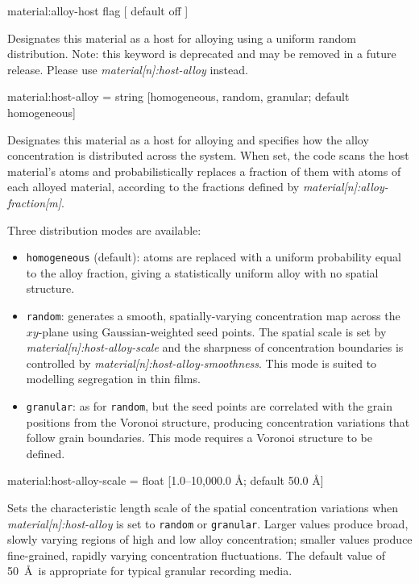 {\zicf material:alloy-host flag [ default off ]} Designates this material as a host for alloying using a uniform random distribution. Note: this keyword is deprecated and may be removed in a future release. Please use \textit{material[n]:host-alloy} instead.


{\zicf material:host-alloy = string [homogeneous, random, granular; default homogeneous]} Designates this material as a host for alloying and specifies how the alloy concentration is distributed across the system. When set, the code scans the host material's atoms and probabilistically replaces a fraction of them with atoms of each alloyed material, according to the fractions defined by \textit{material[n]:alloy-fraction[m]}.

Three distribution modes are available:
\begin{itemize}
  \item[] \texttt{homogeneous} (default): atoms are replaced with a uniform probability equal to the alloy fraction, giving a statistically uniform alloy with no spatial structure.
  \item[] \texttt{random}: generates a smooth, spatially-varying concentration map across the $xy$-plane using Gaussian-weighted seed points. The spatial scale is set by \textit{material[n]:host-alloy-scale} and the sharpness of concentration boundaries is controlled by \textit{material[n]:host-alloy-smoothness}. This mode is suited to modelling segregation in thin films.
  \item[] \texttt{granular}: as for \texttt{random}, but the seed points are correlated with the grain positions from the Voronoi structure, producing concentration variations that follow grain boundaries. This mode requires a Voronoi structure to be defined.
\end{itemize}

{\zicf material:host-alloy-scale = float [1.0--10,000.0 \AA; default 50.0 \AA]} Sets the characteristic length scale of the spatial concentration variations when \textit{material[n]:host-alloy} is set to \texttt{random} or \texttt{granular}. Larger values produce broad, slowly varying regions of high and low alloy concentration; smaller values produce fine-grained, rapidly varying concentration fluctuations. The default value of 50~\AA\ is appropriate for typical granular recording media.

